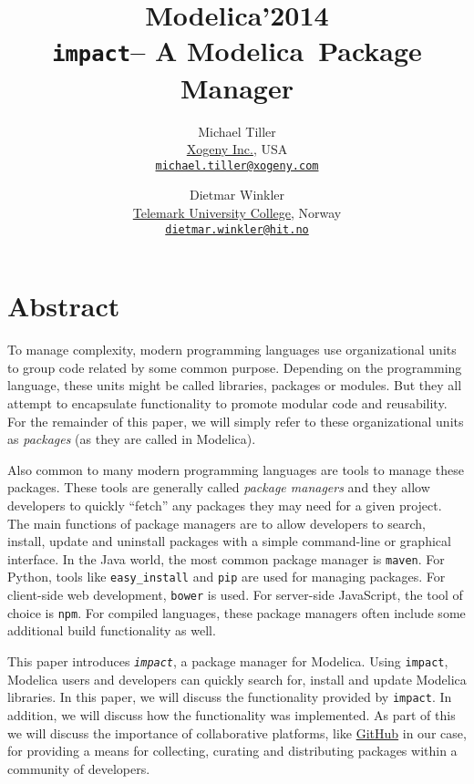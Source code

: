 \documentclass[11pt,a4paper,twocolumn]{article}
\newcommand{\myr}{\textsuperscript{\textregistered}}
\newcommand{\impact}{\texttt{impact}} %
\newcommand{\code}[1]{\texttt{#1}} %
\begin{document}
\title{\textbf{{\small Modelica'2014}\\
    \impact -- A Modelica\myr\ Package Manager}}

\author{Michael Tiller\\
  \href{http://xogeny.com}{Xogeny Inc.}, USA\\
  \href{mailto:michael.tiller@xogeny.com}{\nolinkurl{michael.tiller@xogeny.com}} %
  \and Dietmar Winkler\\
  \href{http://www.hit.no}{Telemark University College}, Norway\\
  \href{mailto:dietmar.winkler@hit.no}{\nolinkurl{dietmar.winkler@hit.no}}}
\date{} %
\maketitle\thispagestyle{empty} %

\section*{Abstract}

To manage complexity, modern programming languages use organizational
units to group code related by some common purpose.  Depending on the
programming language, these units might be called libraries, packages
or modules.  But they all attempt to encapsulate functionality to
promote modular code and reusability.  For the remainder of this
paper, we will simply refer to these organizational units as
\emph{packages} (as they are called in Modelica).

Also common to many modern programming languages are tools to manage
these packages.  These tools are generally called \emph{package
  managers} and they allow developers to quickly ``fetch'' any
packages they may need for a given project.  The main functions of
package managers are to allow developers to search, install, update
and uninstall packages with a simple command-line or graphical
interface.  In the Java world, the most common package manager is
\code{maven}.  For Python, tools like
\code{easy\_install}\cite{easy_install} and \code{pip}\cite{pip} are
used for managing packages.  For client-side web development,
\code{bower} is used.  For server-side JavaScript, the tool of choice
is \code{npm}\cite{npm}.  For compiled languages, these package
managers often include some additional build functionality as well.

This paper introduces \emph{\impact}, a package manager for
Modelica. Using \impact, Modelica users and developers can quickly
search for, install and update Modelica libraries.  In this paper, we
will discuss the functionality provided by \impact.  In addition, we
will discuss how the functionality was implemented.  As part of this
we will discuss the importance of collaborative platforms, like
\href{https://github.com}{GitHub}\cite{github} in our case, for providing
a means for collecting, curating and distributing packages within a community
of developers.
\end{document}
